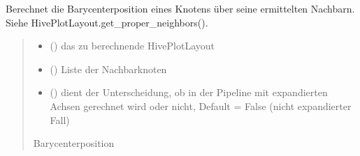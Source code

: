 \documentclass[a4paper,10pt,ngerman]{sphinxmanual}
\begin{document}
\begin{fulllineitems}
\label{\detokenize{api:src.crossing_minimization.calculate_barycenter_position}}
\pysigstartsignatures
\pysiglinewithargsret
{}
{\sphinxparamcomma {}\sphinxparamcomma {}\sphinxparamcomma {}}
{}
\pysigstopsignatures
\sphinxAtStartPar
Berechnet die Barycenterposition eines Knotens über seine ermittelten Nachbarn. Siehe HivePlotLayout.get\_proper\_neighbors().
\begin{quote}\begin{description}
\begin{itemize}
\item {} 
\sphinxAtStartPar
{} () \textendash{} das zu berechnende HivePlotLayout

\item {} 
\sphinxAtStartPar
{} () \textendash{} Liste der Nachbarknoten

\item {} 
\sphinxAtStartPar
{} () \textendash{} dient der Unterscheidung, ob in der Pipeline mit expandierten Achsen gerechnet wird oder nicht, Default = False (nicht expandierter Fall)

\end{itemize}

\sphinxAtStartPar
Barycenterposition

\sphinxAtStartPar
{}

\end{description}\end{quote}

\end{fulllineitems}

\end{document}
